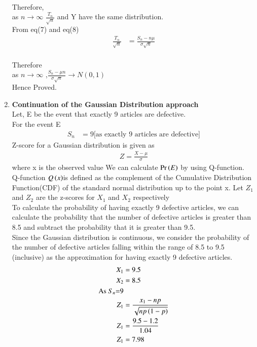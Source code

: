 \documentclass[journal,12pt,twocolumn]{IEEEtran}
\begin{document}
\begin{enumerate}[label=(\Roman*), align=left]
\\Therefore,
\\as $n \to \infty$ $\frac{T_n}{\sqrt{n}}$ and Y have the same distribution.
\\From eq(7) and eq(8)
 \begin{align}
    \frac{T_n}{\sqrt{n}}&= \frac{S_n-n\mu}{\sigma{\sqrt{n}}}
    \end{align}
\\Therefore
\\ as $n \to \infty$ ,$\frac{S_n -\mu{n}}{\sigma{\sqrt{n}}} \to N(0,1)$
\\Hence Proved.
\item \textbf{Continuation of the Gaussian Distribution approach}
 \\Let, E be the event that exactly 9 articles are defective.
 \\For the event E
 \begin{align}
    S_n &= 9 \text{[as exactly 9 articles are defective]}\nonumber
    \end{align}
Z-score for a Gaussian distribution is given as
 \begin{align}
    Z=\frac{X-\mu}{\sigma}
    \end{align}
where x is the observed value
We can calculate $\Pr\left(E\right)$ by using Q-function.
\\Q-function $Q\left(x\right)$is defined as the complement of the Cumulative Distribution Function(CDF) of the standard normal distribution up to the point x.
Let $Z_1$ and $Z_2$ are the z-scores for $X_1$ and $X_2$ respectively
\\To calculate the probability of having exactly 9 defective articles, we can calculate the probability that the number of defective articles is greater than 8.5 and subtract the probability that it is greater than 9.5.
\\Since the Gaussian distribution is continuous, we consider the probability of the number of defective articles falling within the range of 8.5 to 9.5 (inclusive) as the approximation for having exactly 9 defective articles.
 \begin{align}
    X_1 &=9.5\nonumber\\
    X_2 &=8.5\nonumber\\
    \text{As $S_n$=9}\nonumber\\
    Z_1 &=\frac{x_1-np}{\sqrt{np\brak{1-p}}}\nonumber\\
    Z_1 &= \frac{9.5-1.2}{1.04}\nonumber\\
    Z_1 &= 7.98\\

\end{align}
\end{enumerate}
\end{document}

